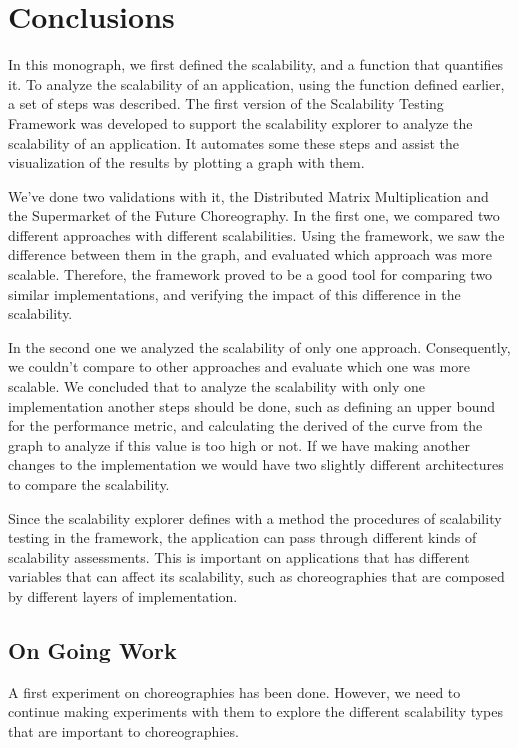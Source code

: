 \section{Conclusions}

In this monograph, we first defined the scalability, and a function that quantifies it. To analyze the scalability of an application, using the function defined earlier, a set of steps was described. The first version of the Scalability Testing Framework was developed to support the scalability explorer to analyze the scalability of an application. It automates some these steps and assist the visualization of the results by plotting a graph with them.

We've done two validations with it, the Distributed Matrix Multiplication and the Supermarket of the Future Choreography. In the first one, we compared two different approaches with different scalabilities. Using the framework, we saw the difference between them in the graph, and evaluated which approach was more scalable. Therefore, the framework proved to be a good tool for comparing two similar implementations, and verifying the impact of this difference in the scalability.

In the second one we analyzed the scalability of only one approach. Consequently, we couldn't compare to other approaches and evaluate which one was more scalable. We concluded that to analyze the scalability with only one implementation another steps should be done, such as defining an upper bound for the performance metric, and calculating the derived of the curve from the graph to analyze if this value is too high or not. If we have making another changes to the implementation we would have two slightly different architectures to compare the scalability. 

Since the scalability explorer defines with a method the procedures of scalability testing in the framework, the application can pass through different kinds of scalability assessments. This is important on applications that has different variables that can affect its scalability, such as choreographies that are composed by different layers of implementation.

\subsection{On Going Work}

A first experiment on choreographies has been done. However, we need to continue making experiments with them to explore the different scalability types that are important to choreographies. 

